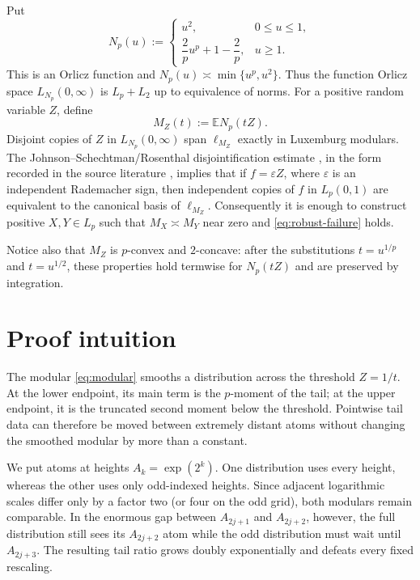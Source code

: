 \documentclass[11pt]{article}
\theoremstyle{definition}
\theoremstyle{remark}
\newcommand{\E}{\mathbb E}
\begin{document}
Put
\begin{equation}\label{eq:Np}
  N_p(u):=
  \begin{cases}
    u^2,&0\leq u\leq1,\\
    \dfrac2p u^p+1-\dfrac2p,&u\geq1.
  \end{cases}
\end{equation}
This is an Orlicz function and
$N_p(u)\asymp\min\{u^p,u^2\}$.  Thus the function Orlicz space
$L_{N_p}(0,\infty)$ is $L_p+L_2$ up to equivalence of norms.  For a positive
random variable $Z$, define
\begin{equation}\label{eq:modular}
  M_Z(t):=\E N_p(tZ).
\end{equation}
Disjoint copies of $Z$ in $L_{N_p}(0,\infty)$ span $\ell_{M_Z}$ exactly in
Luxemburg modulars.  The Johnson--Schechtman/Rosenthal disjointification
estimate \cite{JS89}, in the form recorded in the source literature
\cite[\S\,2.4]{Ast24a}, implies that if $f=\varepsilon Z$, where
$\varepsilon$ is an independent Rademacher sign, then independent copies of
$f$ in $L_p(0,1)$ are equivalent to the canonical basis of $\ell_{M_Z}$.
Consequently it is enough to construct positive $X,Y\in L_p$ such that
$M_X\asymp M_Y$ near zero and \eqref{eq:robust-failure} holds.

Notice also that $M_Z$ is $p$-convex and $2$-concave: after the substitutions
$t=u^{1/p}$ and $t=u^{1/2}$, these properties hold termwise for
$N_p(tZ)$ and are preserved by integration.

\section{Proof intuition}

The modular \eqref{eq:modular} smooths a distribution across the threshold
$Z=1/t$.  At the lower endpoint, its main term is the $p$-moment of the tail;
at the upper endpoint, it is the truncated second moment below the threshold.
Pointwise tail data can therefore be moved between extremely distant atoms
without changing the smoothed modular by more than a constant.

We put atoms at heights $A_k=\exp(2^k)$.  One distribution uses every height,
whereas the other uses only odd-indexed heights.  Since adjacent logarithmic
scales differ only by a factor two (or four on the odd grid), both modulars
remain comparable.  In the enormous gap between $A_{2j+1}$ and $A_{2j+2}$,
however, the full distribution still sees its $A_{2j+2}$ atom while the odd
distribution must wait until $A_{2j+3}$.  The resulting tail ratio grows
doubly exponentially and defeats every fixed rescaling.
\end{document}
